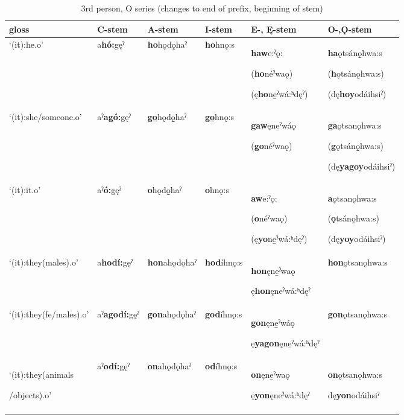 \begin{table}
\caption{3rd person, O series (changes to end of prefix, beginning of stem)}
\label{tab:1:3ppron2}
\tiny{
\begin{tabularx}{\textwidth}{XXXXXX}
\lsptoprule
gloss & C-stem & A-stem & I-stem & E-, Ę{}-stem & O-,Ǫ{}-stem\\
\midrule
‘(it):he.o’ & a\textbf{hó:}gęˀ & \textbf{ho}hǫdǫ̱haˀ & \textbf{ho}hnǫ:s & \textbf{haw}e:ˀǫ:

(\textbf{ho}néˀwaǫ)

(ę\textbf{ho}ne̱ˀwá:ʰdęˀ) & \textbf{ha}ǫtsánǫ̱hwa:s 

(\textbf{h}ǫtsánǫ̱hwa:s)

(dę\textbf{hoy}odáihsiˀ)\\
‘(it):she/someone.o’ & aˀ\textbf{agó:}gęˀ & \textbf{go̱}hǫdǫ̱haˀ & \textbf{go̱}hnǫ:s & \textbf{gaw}ęne̱ˀwáǫ

(\textbf{go}néˀwaǫ) & \textbf{ga}ǫtsanǫhwa:s 

(\textbf{g}ǫtsánǫ̱hwa:s)

(dę\textbf{yagoy}odáihsiˀ)\\
‘(it):it.o’ & aˀ\textbf{ó:}gęˀ & \textbf{o}hǫdǫ̱haˀ & \textbf{o}hnǫ:s & \textbf{aw}e:ˀǫ:

(\textbf{o}néˀwaǫ)

(ę\textbf{yo}ne̱ˀwá:ʰdęˀ) & \textbf{a}ǫtsanǫhwa:s 

(\textbf{ǫ}tsánǫ̱hwa:s)

(dę\textbf{yoy}odáihsiˀ)\\
‘(it):they(males).o’ & a\textbf{hodí:}gęˀ & \textbf{hon}ahǫdǫhaˀ & \textbf{hod}íhnǫ:s & \textbf{hon}ęne̱ˀwaǫ

ę\textbf{hon}ęneˀwá:ʰdęˀ & \textbf{hon}ǫtsanǫhwa:s\\
‘(it):they(fe/males).o’ & aˀ\textbf{agodí:}gęˀ & \textbf{gon}ahǫdǫhaˀ & \textbf{god}íhnǫ:s & \textbf{gon}ęne̱ˀwáǫ

ę\textbf{yagon}ęne̱ˀwá:ʰdęˀ & \textbf{gon}ǫtsanǫhwa:s\\
‘(it):they(animals

/objects).o’ & aˀ\textbf{odí:}gęˀ & \textbf{on}ahǫdǫhaˀ & \textbf{od}íhnǫ:s & \textbf{on}ęne̱ˀwaǫ

ę\textbf{yon}ęneˀwá:ʰdęˀ & \textbf{on}ǫtsanǫhwa:s

dę\textbf{yon}odáihsiˀ\\
\lspbottomrule
\end{tabularx}}
\end{table}


